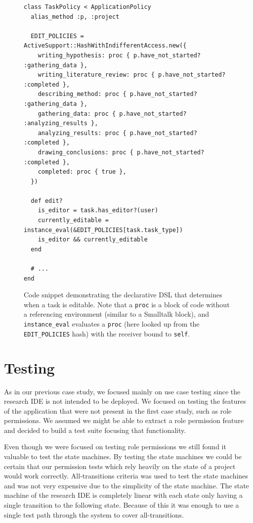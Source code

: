 \documentclass[document.tex]{subfiles}
\begin{document}
\begin{figure}[!ht]
  \begin{lstlisting}
class TaskPolicy < ApplicationPolicy
  alias_method :p, :project

  EDIT_POLICIES = ActiveSupport::HashWithIndifferentAccess.new({
    writing_hypothesis: proc { p.have_not_started? :gathering_data },
    writing_literature_review: proc { p.have_not_started? :completed },
    describing_method: proc { p.have_not_started? :gathering_data },
    gathering_data: proc { p.have_not_started? :analyzing_results },
    analyzing_results: proc { p.have_not_started? :completed },
    drawing_conclusions: proc { p.have_not_started? :completed },
    completed: proc { true },
  })

  def edit?
    is_editor = task.has_editor?(user)
    currently_editable = instance_eval(&EDIT_POLICIES[task.task_type])
    is_editor && currently_editable
  end

  # ...
end
  \end{lstlisting}
  \cprotect\caption{Code snippet demonstrating the declarative DSL that determines when a task is editable. Note that a \verb!proc! is a block of code without a referencing environment (similar to a Smalltalk block), and \verb!instance_eval! evaluates a \verb!proc! (here looked up from the \verb!EDIT_POLICIES! hash) with the receiver bound to \verb!self!.}
  \label{fig:case-research-state-based-policy}
\end{figure}

\FloatBarrier


\section {Testing}

As in our previous case study, we focused mainly on use case testing since the research IDE is not intended to be deployed. We focused on testing the features of the application that were not present in the first case study, such as role permissions. We assumed we might be able to extract a role permission feature and decided to build a test suite focusing that functionality.

Even though we were focused on testing role permissions we still found it valuable to test the state machines. By testing the state machines we could be certain that our permission tests which rely heavily on the state of a project would work correctly. All-transitions criteria was used to test the state machines and was not very expensive due to the simplicity of the state machine. The state machine of the research IDE is completely linear with each state only having a single transition to the following state. Because of this it was enough to use a single test path through the system to cover all-transitions.
\end{document}
